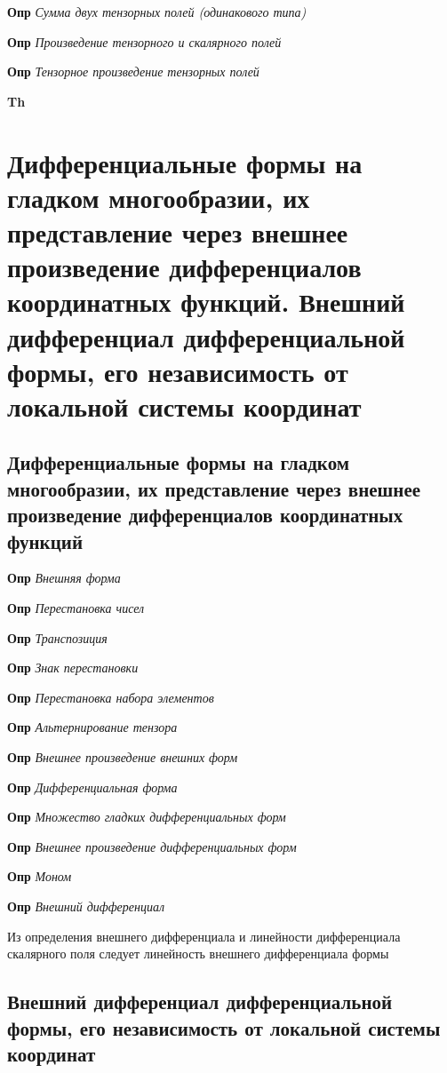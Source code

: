 \documentclass[a4paper, 14pt]{article}
\begin{document}
    \textbf{Опр} \textit{Сумма двух тензорных полей (одинакового типа)}
    
    \textbf{Опр} \textit{Произведение тензорного и скалярного полей}
    
    \textbf{Опр} \textit{Тензорное произведение тензорных полей}
    
    \textbf{Th}
    
    \section{Дифференциальные формы на гладком многообразии, их представление через внешнее произведение
    дифференциалов координатных функций.
    Внешний дифференциал дифференциальной формы, его независимость от локальной системы координат}
    
    \subsection{Дифференциальные формы на гладком многообразии, их представление через внешнее произведение
    дифференциалов координатных функций}
    
    \textbf{Опр} \textit{Внешняя форма}
    
    \textbf{Опр} \textit{Перестановка чисел}
    
    \textbf{Опр} \textit{Транспозиция}
    
    \textbf{Опр} \textit{Знак перестановки}
    
    \textbf{Опр} \textit{Перестановка набора элементов}
    
    \textbf{Опр} \textit{Альтернирование тензора}
    
    \textbf{Опр} \textit{Внешнее произведение внешних форм}
    
    \textbf{Опр} \textit{Дифференциальная форма}
    
    \textbf{Опр} \textit{Множество гладких дифференциальных форм}
    
    \textbf{Опр} \textit{Внешнее произведение дифференциальных форм}
    
    \textbf{Опр} \textit{Моном}
    
    \textbf{Опр} \textit{Внешний дифференциал}
    
    Из определения внешнего дифференциала и линейности дифференциала скалярного поля следует линейность внешнего
    дифференциала формы
    
    \subsection{Внешний дифференциал дифференциальной формы, его независимость от локальной системы координат}
    
\end{document}
